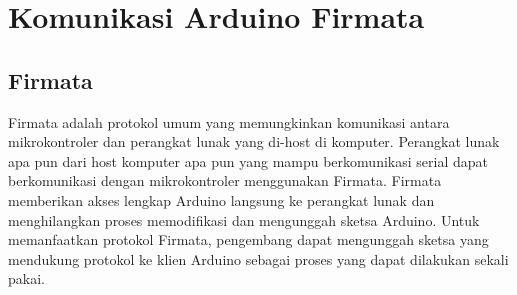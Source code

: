 \section{Komunikasi Arduino Firmata}
\subsection{Firmata}
	Firmata adalah protokol umum yang memungkinkan komunikasi antara mikrokontroler dan perangkat lunak yang di-host di komputer. 
	Perangkat lunak apa pun dari host komputer apa pun yang mampu berkomunikasi serial dapat berkomunikasi dengan mikrokontroler menggunakan Firmata. 
	Firmata memberikan akses lengkap Arduino langsung ke perangkat lunak dan menghilangkan proses memodifikasi dan mengunggah sketsa Arduino. 
	Untuk memanfaatkan protokol Firmata, pengembang dapat mengunggah sketsa yang mendukung protokol ke klien Arduino sebagai proses yang dapat dilakukan sekali pakai. 
